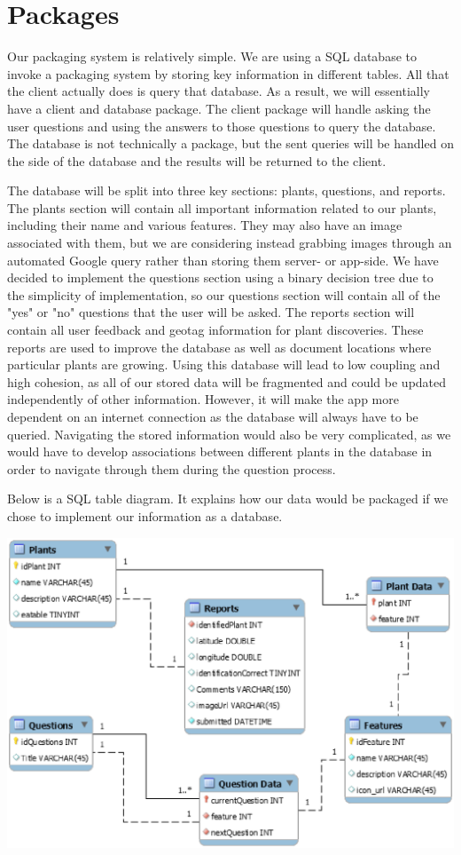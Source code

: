 \documentclass[a4paper]{article}
\begin{document}
\section{Packages}
Our packaging system is relatively simple. We are using a SQL database to invoke a packaging system by storing key information in different tables. All that the client actually does is query that database. As a result, we will essentially have a client and database package. The client package will handle asking the user questions and using the answers to those questions to query the database. The database is not technically a package, but the sent queries will be handled on the side of the database and the results will be returned to the client. 

The database will be split into three key sections: plants, questions, and reports. The plants section will contain all important information related to our plants, including their name and various features. They may also have an image associated with them, but we are considering instead grabbing images through an automated Google query rather than storing them server- or app-side. We have decided to implement the questions section using a binary decision tree due to the simplicity of implementation, so our questions section will contain all of the "yes" or "no" questions that the user will be asked. The reports section will contain all user feedback and geotag information for plant discoveries. These reports are used to improve the database as well as document locations where particular plants are growing. Using this database will lead to low coupling and high cohesion, as all of our stored data will be fragmented and could be updated independently of other information. However, it will make the app more dependent on an internet connection as the database will always have to be queried. Navigating the stored information would also be very complicated, as we would have to develop associations between different plants in the database in order to navigate through them during the question process.

Below is a SQL table diagram. It explains how our data would be packaged if we chose to implement our information as a database.

\begin{center}\includegraphics[scale=.6]{DatabaseDesign.eps}\end{center}
\end{document}

